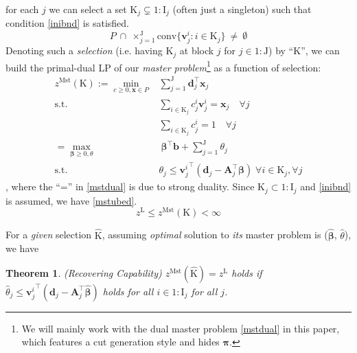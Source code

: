 \documentclass[journal]{IEEEtran}
\newtheorem{theorem}{Theorem}
\begin{document}
for each $j$ we can select a set $\mathrm{K}_j \subsetneq 1\!:\!\mathrm{I}_j$
(often just a singleton) such that condition \eqref{inibnd} is satisfied.
\begin{equation}\label{inibnd}
    P \ \cap \ \times_{j=1}^\mathrm{J} \text{conv}\{\mathbf{v}_j^i : i \in \mathrm{K}_j\} \ \neq \ \emptyset
\end{equation}
Denoting such a \textit{selection} (i.e. having $\mathrm{K}_j$ at block $j$ for $j \in 1\!:\!\mathrm{J}$) by ``$\mathrm{K}$'',
we can build the primal-dual LP of our \textit{master problem}\footnote{We will mainly work with the dual master problem \eqref{mstdual} in this paper, which features a cut generation style and hides $\boldsymbol{\pi}$.}
as a function of selection:
\begin{align}
    z^\mathrm{Mst}(\mathrm{K}) := \min_{c \geqslant 0, \mathbf{x} \in P} & \sum_{j=1}^\mathrm{J} \mathbf{d}_j^\top \mathbf{x}_j \label{mstprim} \\
    \text{s.t. }& \sum_{i\in \mathrm{K}_j} c_j^i \mathbf{v}_j^i = \mathbf{x}_j   \quad \forall j \\
     & \sum_{i\in \mathrm{K}_j} c_j^i = 1 \quad  \forall j \label{mstprimend} \\
    = \max_{\boldsymbol{\beta} \geqslant 0, \theta} & \ \boldsymbol{\beta}^\top \mathbf{b} + \sum_{j=1}^\mathrm{J} \theta_j \label{mstdual} \\
    \text{s.t. } & \theta_j \le {\mathbf{v}_j^i}^\top (\mathbf{d}_j - \mathbf{A}_j^\top\boldsymbol{\beta}) \; \forall i \in \mathrm{K}_j, \forall j \label{mstdual1}
\end{align}
, where the ``='' in \eqref{mstdual} is due to strong duality.
Since $\mathrm{K}_j \subset 1\!:\!\mathrm{I}_j$ and \eqref{inibnd} is assumed,
we have \eqref{mstubed}.
\begin{equation}\label{mstubed}
    z^\mathrm{L} \le z^\mathrm{Mst}(\mathrm{K}) < \infty
\end{equation}
\par
For a \textit{given} selection $\hat{\mathrm{K}}$, assuming \textit{optimal} solution to \textit{its}
master problem is ($\hat{\boldsymbol{\beta}}$, $\hat{\theta}$),
we have
\begin{theorem}(Recovering Capability) \label{recovercap}
    \( z^\mathrm{Mst}(\hat{\mathrm{K}}) = z^\mathrm{L} \) holds \textit{if}
    \( \hat{\theta}_j \le {\mathbf{v}_j^i}^\top (\mathbf{d}_j - \mathbf{A}_j^\top \hat{\boldsymbol{\beta}}) \) holds
    for all $i \in 1\!:\!\mathrm{I}_j$ for all $j$.
\end{theorem}
\end{document}
